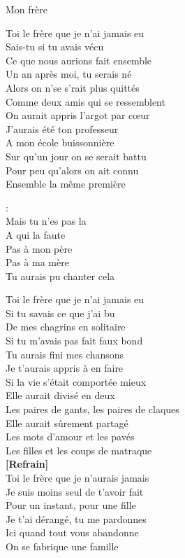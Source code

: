 \documentclass{novel}
\begin{document}
\newpage
\normalsize

\h*{Mon frère}
\begin{multicols}{2}

Toi le frère que je n'ai jamais eu\\
Sais-tu si tu avais vécu\\
Ce que nous aurions fait ensemble\\
Un an après moi, tu serais né\\
Alors on n'se s'rait plus quittés\\
Comme deux amis qui se ressemblent\\
On aurait appris l'argot par cœur\\
J'aurais été ton professeur\\
A mon école buissonnière\\
Sur qu'un jour on se serait battu\\
Pour peu qu'alors on ait connu\\
Ensemble la même première\\

\begin{bfseries}
[Refrain]:\\
Mais tu n'es pas la\\
A qui la faute\\
Pas à mon père\\
Pas à ma mère\\
Tu aurais pu chanter cela\\
\end{bfseries}

\columnbreak
Toi le frère que je n'ai jamais eu\\
Si tu savais ce que j'ai bu\\
De mes chagrins en solitaire\\
Si tu m'avais pas fait faux bond\\
Tu aurais fini mes chansons\\
Je t'aurais appris à en faire\\
Si la vie s'était comportée mieux\\
Elle aurait divisé en deux\\
Les paires de gants, les paires de claques\\
Elle aurait sûrement partagé\\
Les mots d'amour et les pavés\\
Les filles et les coups de matraque\\

\textbf{[Refrain]}\\

Toi le frère que je n'aurais jamais\\
Je suis moins seul de t'avoir fait\\
Pour un instant, pour une fille\\
Je t'ai dérangé, tu me pardonnes\\
Ici quand tout vous abandonne\\
On se fabrique une famille\\
\end{multicols}
\end{document}
